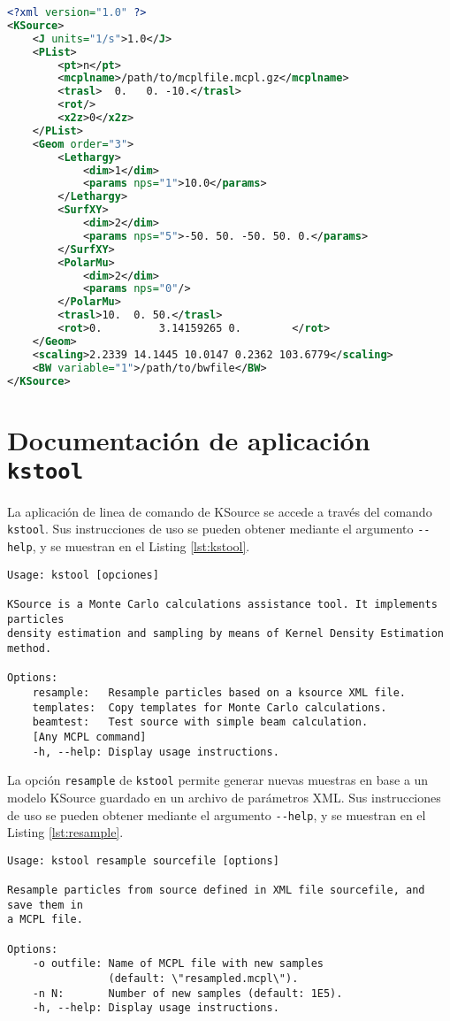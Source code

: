 \begin{lstlisting}[language=XML, label={lst:xmlfile}, caption=Ejemplo de archivo de parámetros XML.]
<?xml version="1.0" ?>
<KSource>
	<J units="1/s">1.0</J>
	<PList>
		<pt>n</pt>
		<mcplname>/path/to/mcplfile.mcpl.gz</mcplname>
		<trasl>  0.   0. -10.</trasl>
		<rot/>
		<x2z>0</x2z>
	</PList>
	<Geom order="3">
		<Lethargy>
			<dim>1</dim>
			<params nps="1">10.0</params>
		</Lethargy>
		<SurfXY>
			<dim>2</dim>
			<params nps="5">-50. 50. -50. 50. 0.</params>
		</SurfXY>
		<PolarMu>
			<dim>2</dim>
			<params nps="0"/>
		</PolarMu>
		<trasl>10.  0. 50.</trasl>
		<rot>0.         3.14159265 0.        </rot>
	</Geom>
	<scaling>2.2339 14.1445 10.0147 0.2362 103.6779</scaling>
	<BW variable="1">/path/to/bwfile</BW>
</KSource>
\end{lstlisting}




\section{Documentación de aplicación \texttt{kstool}}
\label{ap:CLI}

La aplicación de linea de comando de KSource se accede a través del comando \verb|kstool|. Sus instrucciones de uso se pueden obtener mediante el argumento \verb|--help|, y se muestran en el Listing \ref{lst:kstool}.

\begin{lstlisting}[label={lst:kstool}, caption=Instrucciones de uso del comando \texttt{kstool} (output de ``\texttt{kstool --help}'').]
Usage: kstool [opciones]

KSource is a Monte Carlo calculations assistance tool. It implements particles
density estimation and sampling by means of Kernel Density Estimation method.

Options:
	resample:   Resample particles based on a ksource XML file.
	templates:  Copy templates for Monte Carlo calculations.
	beamtest:   Test source with simple beam calculation.
	[Any MCPL command]
	-h, --help: Display usage instructions.
\end{lstlisting}

La opción \verb|resample| de \verb|kstool| permite generar nuevas muestras en base a un modelo KSource guardado en un archivo de parámetros XML. Sus instrucciones de uso se pueden obtener mediante el argumento \verb|--help|, y se muestran en el Listing \ref{lst:resample}.

\begin{lstlisting}[label={lst:resample}, caption=Instrucciones de uso del comando \texttt{kstool resample} (output de ``\texttt{kstool resample --help}'').]
Usage: kstool resample sourcefile [options]

Resample particles from source defined in XML file sourcefile, and save them in
a MCPL file.

Options:
	-o outfile: Name of MCPL file with new samples
	            (default: \"resampled.mcpl\").
	-n N:       Number of new samples (default: 1E5).
	-h, --help: Display usage instructions.
\end{lstlisting}

